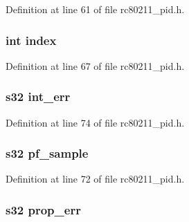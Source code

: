 Definition at line 61 of file rc80211\-\_\-pid.\-h.

\hypertarget{unionrc__pid__event__data_a750b5d744c39a06bfb13e6eb010e35d0}{
\subsubsection[{index}]{\setlength{\rightskip}{0pt plus 5cm}int index}}\label{unionrc__pid__event__data_a750b5d744c39a06bfb13e6eb010e35d0}


Definition at line 67 of file rc80211\-\_\-pid.\-h.

\hypertarget{unionrc__pid__event__data_afd0a2b97b5e445f22caaf127bf38148c}{
\subsubsection[{int\-\_\-err}]{\setlength{\rightskip}{0pt plus 5cm}s32 int\-\_\-err}}\label{unionrc__pid__event__data_afd0a2b97b5e445f22caaf127bf38148c}


Definition at line 74 of file rc80211\-\_\-pid.\-h.

\hypertarget{unionrc__pid__event__data_ab03cef57c5c881d1d6510822f2933fdc}{
\subsubsection[{pf\-\_\-sample}]{\setlength{\rightskip}{0pt plus 5cm}s32 pf\-\_\-sample}}\label{unionrc__pid__event__data_ab03cef57c5c881d1d6510822f2933fdc}


Definition at line 72 of file rc80211\-\_\-pid.\-h.

\hypertarget{unionrc__pid__event__data_a236877cfccb9799bf6c8d35aca9faa2c}{
\subsubsection[{prop\-\_\-err}]{\setlength{\rightskip}{0pt plus 5cm}s32 prop\-\_\-err}}\label{unionrc__pid__event__data_a236877cfccb9799bf6c8d35aca9faa2c}


